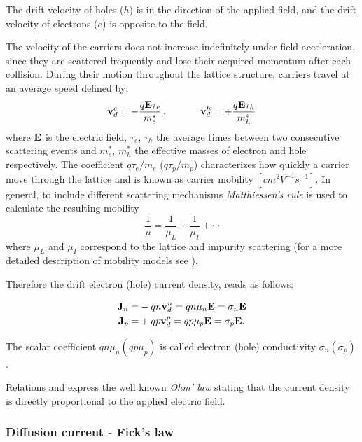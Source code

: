 \begin{Osservazione}
The drift velocity of holes ($h$) is in the direction of the applied field, and the drift velocity of electrons ($e$) is opposite to the field.
\end{Osservazione}

The velocity of the carriers does not increase indefinitely under field acceleration, since they are scattered frequently and lose their acquired momentum after each collision.
During their motion throughout the lattice structure, carriers travel at an average speed defined by:
\begin{equation}
\label{eq: velocities}
\vect{v}_d^e = - \dfrac{q\vect{E}\tau_e}{m_e^*} \, , \psp{20} 
\vect{v}_d^h = + \dfrac{q\vect{E}\tau_h}{m_h^*}
\end{equation}
where $\mathbf{E}$ is the electric field, $\tau_e$, $\tau_h$ the average times between two consecutive scattering events and $m_e^*$, $m_h^*$ the effective masses of electron and hole respectively.
The coefficient $q\tau_e / m_e$ ($q\tau_p / m_p$) characterizes how quickly a carrier move through the lattice and is known as carrier mobility $[cm^2V^{-1}s^{-1}]$.
In general, to include different scattering mechanisms \textit{Matthiessen's rule} is used to calculate the resulting mobility
\begin{equation}
\dfrac{1}{\mu} = \dfrac{1}{\mu_L} + \dfrac{1}{\mu_I} + \cdots
\end{equation}
where $\mu_L$ and $\mu_I$ correspond to the lattice and impurity scattering (for a more detailed description of mobility models see \cite{ModernVLSIdevices}). 

Therefore the drift electron (hole) current density, reads as follows:

\begin{align}
\mathbf{J}_n =& -qn\mathbf{v}_d^n = qn\mu_n\mathbf{E}   = \sigma_n\mathbf{E} \label{eq: drift electron} \\ 
\mathbf{J}_p =& +qp\mathbf{v}_d^p = qp\mu_p\mathbf{E} = \sigma_p\mathbf{E}. \label{eq: drift hole}
\end{align}

The scalar coefficient $qn\mu_n(qp\mu_p)$ is called electron (hole) conductivity $\sigma_n(\sigma_p)$. 

Relations  and  express the well known \textit{Ohm' law} stating that the current density is directly proportional to the applied electric field.


\subsubsection{Diffusion current - Fick's law}

